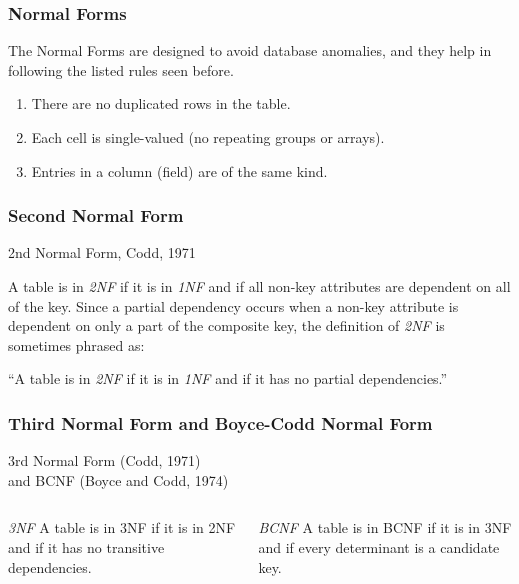 \documentclass[xcolor=dvipsnames]{beamer}
\begin{document}
\begin{frame}[fragile]
  \frametitle{Normal Forms}

  The Normal Forms are designed to avoid database anomalies, and they help
  in following the listed rules seen before.

  \vfill


  \vfill

  \begin{enumerate}
  \item There are no duplicated rows in the table.
  \item Each cell is single-valued (no repeating groups or arrays).
  \item Entries in a column (field) are of the same kind.
  \end{enumerate}  
\end{frame}

\begin{frame}[fragile]
  \frametitle{Second Normal Form}

  \begin{center}
    {\Large 2nd Normal Form, Codd, 1971}
  \end{center}

  \vfill
  
  A table is in \textit{\Large 2NF} if it is in \textit{\Large 1NF} and if
  all non-key attributes are dependent on all of the key. Since a partial
  dependency occurs when a non-key attribute is dependent on only a part of
  the composite key, the definition of \textit{2NF} is sometimes phrased as:
  
  \vfill
  
  “A table is in \textit{2NF} if it is in \textit{1NF} and if it has no
  partial dependencies.”
\end{frame}

\begin{frame}[fragile]
  \frametitle{Third Normal Form and Boyce-Codd Normal Form}

  \begin{center}
    {\Large 3rd Normal Form (Codd, 1971) \\ and BCNF (Boyce and Codd, 1974)}
  \end{center}

  \begin{columns}[c]

    \textit{\Large 3NF} A table is in 3NF if it is in 2NF and if it has no
    transitive dependencies.


    \textit{\Large BCNF} A table is in BCNF if it is in 3NF and if every
    determinant is a candidate key.
  \end{columns}  
\end{frame}
\end{document}
